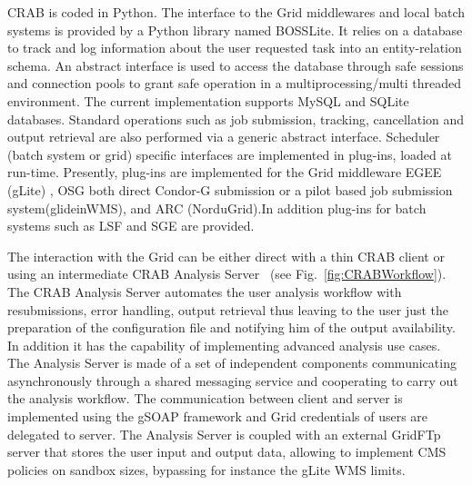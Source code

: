 CRAB is coded in Python. The interface to the Grid middlewares and local batch systems is provided by a Python library named BOSSLite\cite{RefBOSSLite}. It relies on a database to track and log information about the user requested task into an entity-relation schema.
An abstract interface is used to access the database through safe sessions and connection pools to grant safe operation in a multiprocessing/multi threaded environment. The current implementation supports MySQL and SQLite databases.
Standard operations such as job submission, tracking, cancellation and output retrieval are also performed via a generic abstract interface. Scheduler (batch system or grid) specific interfaces are implemented in plug-ins, loaded at run-time. Presently, plug-ins are implemented for the Grid middleware EGEE (gLite) \cite{RefgLiteWMS}, OSG \cite{RefOSG} both direct Condor-G submission or a pilot based job submission system(glideinWMS\cite{Refglidein}), and ARC (NorduGrid)\cite{RefARC}.In addition plug-ins for batch systems such as LSF and SGE are provided.

The interaction with the Grid can be either direct with a thin CRAB client or using an intermediate CRAB Analysis Server~\cite{RefCRAB} (see Fig.~\ref{fig:CRABWorkflow}). The CRAB Analysis Server automates the user analysis workflow with resubmissions, error handling, output retrieval thus leaving to the user just the preparation of the configuration file and notifying him of the output availability. In addition it has the capability of implementing advanced analysis use cases.
The Analysis Server is made of a set of independent components communicating asynchronously through a shared messaging service and cooperating to carry out the analysis workflow. The communication between client and server is implemented using the gSOAP framework and Grid credentials of users are delegated to server.
The Analysis Server is coupled with an external GridFTp server %
 that stores the user input and output data, allowing to implement CMS policies on sandbox sizes, bypassing for instance the gLite WMS limits.


